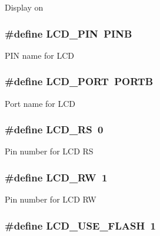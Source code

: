 Display on \hypertarget{group__ex4__lcd_ga43bf5ff1a3bba7fcc6f7ec44d172efe7}{
\subsubsection[{L\-C\-D\-\_\-\-P\-I\-N}]{\setlength{\rightskip}{0pt plus 5cm}\#define L\-C\-D\-\_\-\-P\-I\-N~P\-I\-N\-B}}\label{group__ex4__lcd_ga43bf5ff1a3bba7fcc6f7ec44d172efe7}
P\-I\-N name for L\-C\-D \hypertarget{group__ex4__lcd_gabcf42bd88b3c36193f301ca25b033875}{
\subsubsection[{L\-C\-D\-\_\-\-P\-O\-R\-T}]{\setlength{\rightskip}{0pt plus 5cm}\#define L\-C\-D\-\_\-\-P\-O\-R\-T~P\-O\-R\-T\-B}}\label{group__ex4__lcd_gabcf42bd88b3c36193f301ca25b033875}
Port name for L\-C\-D \hypertarget{group__ex4__lcd_ga4781e073871c6f27f89b9463ad3a4ed1}{
\subsubsection[{L\-C\-D\-\_\-\-R\-S}]{\setlength{\rightskip}{0pt plus 5cm}\#define L\-C\-D\-\_\-\-R\-S~0}}\label{group__ex4__lcd_ga4781e073871c6f27f89b9463ad3a4ed1}
Pin number for L\-C\-D R\-S \hypertarget{group__ex4__lcd_ga26089a10ddd59a0dc7283c19ccc02533}{
\subsubsection[{L\-C\-D\-\_\-\-R\-W}]{\setlength{\rightskip}{0pt plus 5cm}\#define L\-C\-D\-\_\-\-R\-W~1}}\label{group__ex4__lcd_ga26089a10ddd59a0dc7283c19ccc02533}
Pin number for L\-C\-D R\-W \hypertarget{group__ex4__lcd_ga0883c996256a447970de71ff34d036b1}{
\subsubsection[{L\-C\-D\-\_\-\-U\-S\-E\-\_\-\-F\-L\-A\-S\-H}]{\setlength{\rightskip}{0pt plus 5cm}\#define L\-C\-D\-\_\-\-U\-S\-E\-\_\-\-F\-L\-A\-S\-H~1}}\label{group__ex4__lcd_ga0883c996256a447970de71ff34d036b1}
